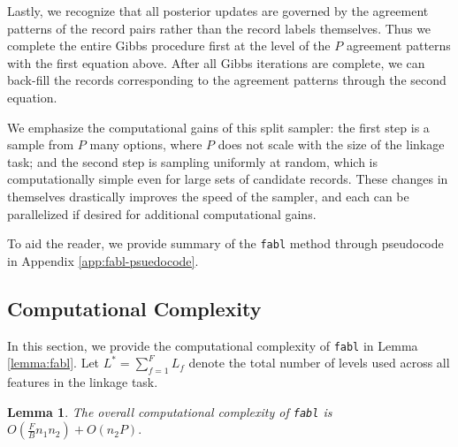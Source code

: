 \documentclass[12pt,letterpaper]{article}
\newcommand{\1}[1]{\mathbb{I}\!\left[#1\right]} %
\newtheorem*{lemma}{Lemma}
\begin{document}
Lastly, we recognize that all posterior updates are governed by the agreement patterns of the record pairs rather than the record labels themselves. Thus we complete the entire Gibbs procedure first at the level of the \(P\) agreement patterns with the first equation above. After all Gibbs iterations are complete, we can back-fill the records corresponding to the agreement patterns through the second equation.

We emphasize the computational gains of this split sampler: the first step is a sample from $P$ many options, where $P$ does not scale with the size of the linkage task; and the second step is sampling uniformly at random, which is computationally simple even for large sets of candidate records. These changes in themselves drastically improves the speed of the sampler, and each can be parallelized if desired for additional computational gains. 

To aid the reader, we provide summary of the \texttt{fabl} method through pseudocode in Appendix \ref{app:fabl-psuedocode}.

\hypertarget{computational-complexity}{%
	\subsection{Computational Complexity}\label{computational-complexity}}
In this section, we provide the computational complexity of \texttt{fabl} in Lemma \ref{lemma:fabl}. Let $L^{*} = \sum_{f=1}^F L_f$ denote the total number of levels used across all features in the linkage task. 

\begin{lemma}
The overall computational complexity of \texttt{fabl} is $O(\frac{F}{B} n_1 n_2) + O(n_2 P).$
\end{lemma}
\end{document}
